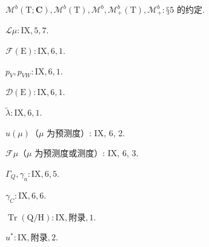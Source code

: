 \(\mathcal{M}^b(\mathrm{T}; \mathbf{C}), \mathcal{M}^b(\mathrm{T}), \mathcal{M}^b, \mathcal{M}_+^b(\mathrm{T}), \mathcal{M}_+^b: \text{§5 的约定}\).

\(\mathcal{L}\mu: \mathrm{IX}, 5, 7\).

\(\mathcal{F}(\mathrm{E}): \mathrm{IX}, 6, 1\).

\(p_V, p_{VW}: \mathrm{IX}, 6, 1\).

\(\mathcal{D}(\mathrm{E}): \mathrm{IX}, 6, 1\).

\(\widetilde{\lambda}: \mathrm{IX}, 6, 1\).

\(u(\mu)\)（\(\mu\) 为预测度）: IX, 6, 2.

\(\mathcal{F}\mu\)（\(\mu\) 为预测度或测度）: IX, 6, 3.

\(\Gamma_Q, \gamma_a: \mathrm{IX}, 6, 5\).

\(\gamma_C: \mathrm{IX}, 6, 6\).

\(\operatorname{Tr}(\mathrm{Q}/\mathrm{H}): \mathrm{IX}, \text{附录}, 1\).

\(u^*: \mathrm{IX}, \text{附录}, 2\).
\relax{}
